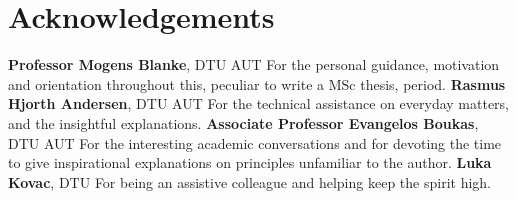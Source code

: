 \section*{Acknowledgements}
\textbf{Professor Mogens Blanke}, DTU AUT\newline
For the personal guidance, motivation and orientation throughout this, peculiar to write a MSc thesis, period.\newline
\textbf{Rasmus Hjorth Andersen}, DTU AUT\newline
For the technical assistance on everyday matters, and the insightful explanations.\newline
\textbf{Associate Professor Evangelos Boukas}, DTU AUT\newline
For the interesting academic conversations and for devoting the time to give inspirational explanations on principles unfamiliar to the author.\newline
\textbf{Luka Kovac}, DTU\newline
For being an assistive colleague and helping keep the spirit high.\newline
%

